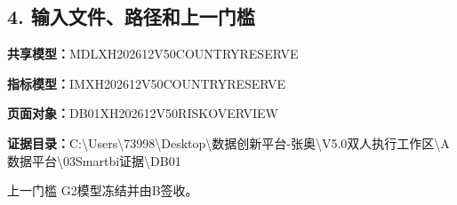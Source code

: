 \documentclass[UTF8,openany,zihao=-4]{ctexbook}
\renewcommand{\_}{\textunderscore\allowbreak}
\begin{document}
\subsection*{4. 输入文件、路径和上一门槛}
\noindent\textbf{共享模型：}{\promptlatin\promptcjk\small MDL\_\allowbreak{}XH202612\_\allowbreak{}V50\_\allowbreak{}COUNTRY\_\allowbreak{}RESERVE}\par
\noindent\textbf{指标模型：}{\promptlatin\promptcjk\small IM\_\allowbreak{}XH202612\_\allowbreak{}V50\_\allowbreak{}COUNTRY\_\allowbreak{}RESERVE}\par
\noindent\textbf{页面对象：}{\promptlatin\promptcjk\small DB01\_\allowbreak{}XH202612\_\allowbreak{}V50\_\allowbreak{}RISK\_\allowbreak{}OVERVIEW}\par
\noindent\textbf{证据目录：}{\promptlatin\promptcjk\small C:\textbackslash{}\allowbreak{}Users\textbackslash{}\allowbreak{}73998\textbackslash{}\allowbreak{}Desktop\textbackslash{}\allowbreak{}数据创新平台-\allowbreak{}张奥\textbackslash{}\allowbreak{}V5.0\_\allowbreak{}双人执行工作区\textbackslash{}\allowbreak{}A\_\allowbreak{}数据平台\textbackslash{}\allowbreak{}03\_\allowbreak{}Smartbi证据\textbackslash{}\allowbreak{}DB01}\par
\begin{gatebox}{上一门槛}
G2模型冻结并由B签收。

\end{gatebox}
\end{document}
